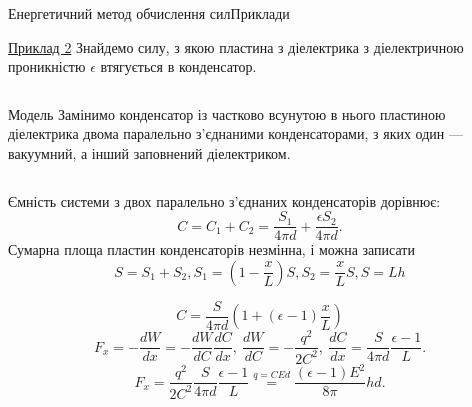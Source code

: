 \documentclass[onlytextwidth]{beamer}
\begin{document}
\begin{frame}{Енергетичний метод обчислення сил}{Приклади}\small
	\begin{exampleblock}{\href{https://www.youtube.com/watch?v=aBAdSE2jC8Y}{Приклад 2}}\justifying
		Знайдемо силу, з якою пластина з діелектрика з діелектричною проникністю $\epsilon$
		втягується в
		конденсатор.
	\end{exampleblock}
	\begin{columns}
		\begin{column}{0.6\linewidth}
			\begin{block}{Модель}\justifying
				Замінимо конденсатор із частково всунутою в нього пластиною діелектрика двома
				паралельно з'єднаними конденсаторами, з яких один --- вакуумний, а інший заповнений
				діелектриком.
			\end{block}
		\end{column}
		\begin{column}{0.4\linewidth}\centering
			
		\end{column}
	\end{columns}
	\begin{overprint}
		\begin{block}{}
			Ємність системи з двох паралельно з'єднаних конденсаторів дорівнює:
			\begin{equation*}
				C = C_1 + C_2 = \frac{S_1}{4\pi d} + \frac{\epsilon S_2}{4\pi d}.
			\end{equation*}
			Сумарна площа пластин конденсаторів незмінна, і можна записати
			\begin{equation*}
				S = S_1 + S_2, S_1 = \left(1- \frac{x}{L} \right)S, S_2 = \frac{x}{L}S, S= Lh
			\end{equation*}
		\end{block}
		\begin{block}{}
			\begin{equation*}
				C = \frac{S}{4\pi d}\left( 1 + (\epsilon -1)\frac{x}{L} \right)
			\end{equation*}
			\begin{equation*}
				F_x = -\frac{dW}{dx} = -\frac{dW}{dC}\frac{dC}{dx},\ \frac{dW}{dC} = -\frac{q^2}{2C^2},\
				\frac{dC}{dx} = \frac{S}{4\pi d} \frac{\epsilon -1}{L}.
			\end{equation*}
			\begin{equation*}
				F_x = \frac{q^2}{2C^2} \frac{S}{4\pi d} \frac{\epsilon -1}{L} \stackrel{q = CEd}{=}
				\frac{(\epsilon -1)E^2}{8\pi} hd.
			\end{equation*}
		\end{block}
	\end{overprint}
\end{frame}
\end{document}
